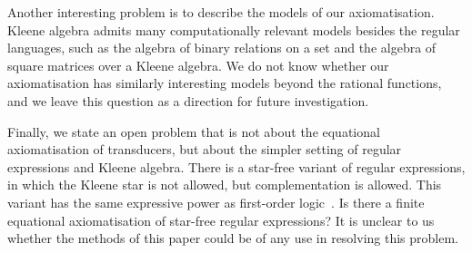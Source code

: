 Another interesting problem is to describe the models of our axiomatisation. Kleene algebra admits many computationally relevant models besides the regular languages, such as the algebra of binary relations on a set and the algebra of square matrices over a Kleene algebra. We do not know whether our axiomatisation has similarly interesting models beyond the rational functions, and we leave this question as a direction for future investigation.

Finally, we state an open problem that is not about the equational axiomatisation of transducers, but about the simpler setting of regular expressions and Kleene algebra. There is a star-free variant of regular expressions, in which the Kleene star is not allowed, but complementation is allowed. This variant has the same expressive power as first-order logic~\cite[Theorem 10.5]{McNaughtonPapert71}. Is there a finite equational axiomatisation of star-free regular expressions? It is unclear to us whether the methods of this paper could be of any use in resolving this problem.